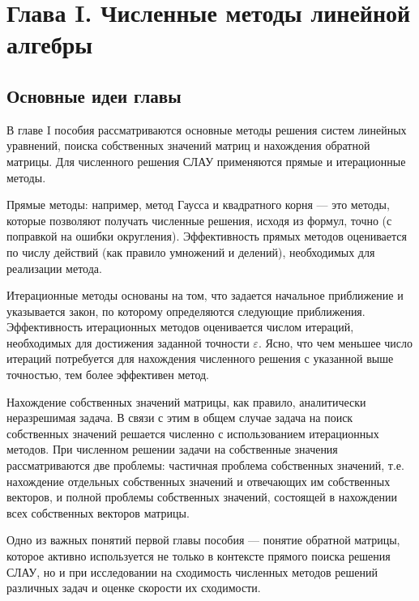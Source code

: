 \newpage
{}
\pagestyle{empty}
\vspace{0.5cm}


\section*{Глава I. Численные методы линейной алгебры}

\subsection{Основные идеи главы}

В главе I пособия рассматриваются основные методы решения систем линейных уравнений, поиска собственных значений матриц и нахождения обратной матрицы. Для численного решения СЛАУ применяются прямые и итерационные методы.

Прямые методы: например, метод Гаусса и квадратного корня — это методы, которые позволяют получать численные решения, исходя из формул, точно (с поправкой на ошибки округления). Эффективность прямых методов оценивается по числу действий (как правило умножений и делений), необходимых для реализации метода.

Итерационные методы основаны на том, что задается начальное приближение и указывается закон, по которому определяются следующие приближения. Эффективность итерационных методов оценивается числом итераций, необходимых для достижения заданной точности \begin{math} \varepsilon \end{math}. Ясно, что чем меньшее число итераций потребуется для нахождения численного решения с указанной выше точностью, тем более эффективен метод.

Нахождение собственных значений матрицы, как правило, аналитически неразрешимая задача. В связи с этим в общем случае задача на поиск собственных значений решается численно с использованием итерационных методов. При численном решении задачи на собственные значения рассматриваются две проблемы: частичная проблема собственных значений, т.е. нахождение отдельных собственных значений и отвечающих им собственных векторов, и полной проблемы собственных значений, состоящей в нахождении всех собственных векторов матрицы.

Одно из важных понятий первой главы пособия — понятие обратной матрицы, которое активно используется не только в контексте прямого поиска решения СЛАУ, но и при исследовании на сходимость численных методов решений различных задач и оценке скорости их сходимости.

